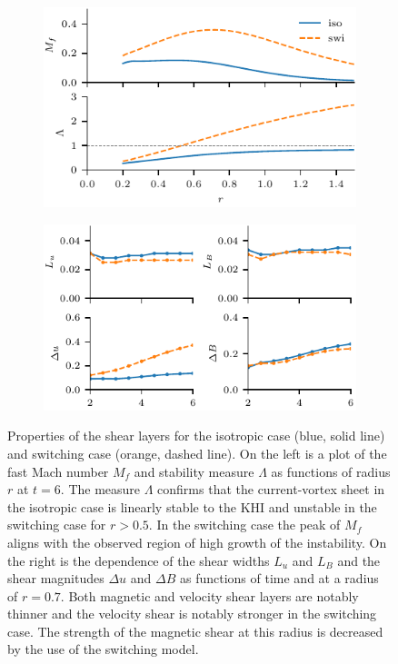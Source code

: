 \begin{figure}[t]
  \centering
    \begin{subfigure}{0.49\textwidth}
      \includegraphics[width=\linewidth]{v-4r-4_mach_t_6}
      \caption{}%
      \label{fig:v-4r-4_mach_t_6}
    \end{subfigure}
    \hfill
    \begin{subfigure}{0.49\textwidth}
      \includegraphics[width=\linewidth]{v-4r-4_layers_with_time}
      \caption{}
      \label{fig:v-4r-4_layers_with_time}
    \end{subfigure}
\caption{Properties of the shear layers for the isotropic case (blue, solid line) and switching case (orange, dashed line). On the left is a plot of the fast Mach number $M_f$ and stability measure $\Lambda$ as functions of radius $r$ at $t=6$. The measure $\Lambda$ confirms that the current-vortex sheet in the isotropic case is linearly stable to the KHI and unstable in the switching case for $r>0.5$. In the switching case the peak of $M_f$ aligns with the observed region of high growth of the instability. On the right is the dependence of the shear widths $L_u$ and $L_B$ and the shear magnitudes $\Delta u$ and $\Delta B$ as functions of time and at a radius of $r=0.7$. Both magnetic and velocity shear layers are notably thinner and the velocity shear is notably stronger in the switching case. The strength of the magnetic shear at this radius is decreased by the use of the switching model.}
\label{fig:v-4r-4_layers}%
\end{figure}

